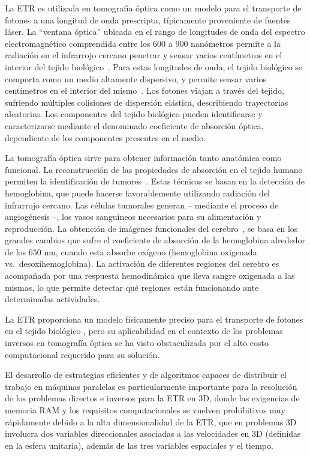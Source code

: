 La ETR es utilizada 
 en tomografía óptica como
 un modelo para el transporte de fotones a una longitud de onda prescripta, 
 típicamente proveniente de fuentes láser.
 La ``ventana óptica'' ubicada en el rango de longitudes de onda del espectro electromagnético comprendida entre los 600 a 900 nanómetros permite a la radiación en el 
 infrarrojo cercano penetrar y sensar varios centímetros en el interior del tejido biológico~\cite{Boas2001}. 
 Para estas longitudes de onda, el tejido 
 biológico se comporta como un medio altamente dispersivo, y 
 permite sensar varios centímetros en el interior del mismo~\cite{Boas2001}.
Los fotones viajan a través del tejido, sufriendo múltiples colisiones 
 de dispersión elástica, describiendo trayectorias aleatorias.
 Los componentes del tejido biológico pueden identificarse y caracterizarse
 mediante el denominado coeficiente de absorción óptica,  dependiente 
 de los componentes presentes en el medio.
 
La tomografía óptica sirve para obtener información tanto anatómica como funcional.
La reconstrucción de las propiedades de absorción en el tejido humano 
 permiten la identificación de tumores~\cite{Zhu2005, Zhu2010, Fujii2016b}.
Estas técnicas se basan en la detección de hemoglobina, que puede hacerse 
favorablemente utilizando radiación del infrarrojo cercano.
Las células tumorales generan -- mediante el proceso de angiogénesis --, 
los vasos sanguíneos necesarios para su alimentación y reproducción.
La obtención de imágenes funcionales del cerebro~\cite{Boas2001, bluestone2001, Arridge1999}, se basa en los grandes cambios 
que sufre el coeficiente de absorción de la hemoglobina 
alrededor de los $650$ nm, cuando esta absorbe oxígeno 
(hemoglobina oxigenada vs.~desoxihemoglobina). 
 La activación de diferentes regiones del cerebro 
 es acompañada por una respuesta hemodinámica que lleva sangre oxigenada 
 a las mismas, lo que permite detectar qué regiones están funcionando 
 ante determinadas actividades. 

La ETR proporciona un
modelo físicamente preciso para el transporte de fotones en el tejido biológico
\cite{Klose2009, Arridge2009}, pero su aplicabilidad en el contexto de
los problemas inversos en tomografía óptica se ha visto obstaculizada por el alto costo computacional requerido para su solución. 

El desarrollo de estrategias eficientes y de algoritmos capaces de distribuir el trabajo en máquinas paralelas es particularmente importante para la
resolución de los problemas directos e inversos para la ETR en 3D, donde las exigencias 
de memoria RAM y
los requisitos computacionales se vuelven prohibitivos muy rápidamente
debido a la alta dimensionalidad de la ETR, que en problemas 3D
involucra dos variables direccionales asociadas a las velocidades en 3D (definidas 
en la esfera unitaria), además de las tres variables espaciales y el tiempo. 

